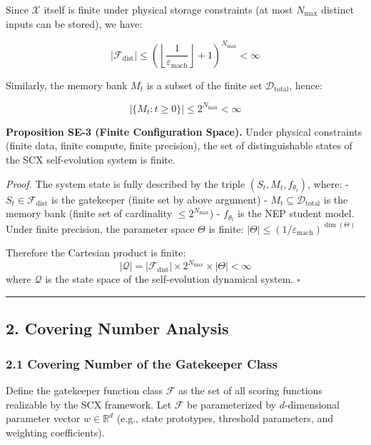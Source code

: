 \documentclass[
  12pt,
]{ctexart}
\begin{document}
Since \(\mathcal{X}\) itself is finite under physical storage
constraints (at most \(N_{\text{max}}\) distinct inputs can be stored),
we have:

\[|\mathcal{F}_{\text{dist}}| \leq \left( \left\lfloor \frac{1}{\varepsilon_{\text{mach}}} \right\rfloor + 1 \right)^{N_{\text{max}}} < \infty\]

Similarly, the memory bank \(M_t\) is a subset of the finite set
\(\mathcal{D}_{\text{total}}\), hence:

\[|\{M_t : t \geq 0\}| \leq 2^{N_{\text{max}}} < \infty\]

\textbf{Proposition SE-3 (Finite Configuration Space).} Under physical
constraints (finite data, finite compute, finite precision), the set of
distinguishable states of the SCX self-evolution system is finite.

\emph{Proof.} The system state is fully described by the triple
\((S_t, M_t, f_{\theta_t})\), where: -
\(S_t \in \mathcal{F}_{\text{dist}}\) is the gatekeeper (finite set by
above argument) - \(M_t \subseteq \mathcal{D}_{\text{total}}\) is the
memory bank (finite set of cardinality \(\leq 2^{N_{\text{max}}}\)) -
\(f_{\theta_t}\) is the NEP student model. Under finite precision, the
parameter space \(\Theta\) is finite:
\(|\Theta| \leq (1/\varepsilon_{\text{mach}})^{\dim(\Theta)}\)

Therefore the Cartesian product is finite:
\[|\mathcal{Q}| = |\mathcal{F}_{\text{dist}}| \times 2^{N_{\text{max}}} \times |\Theta| < \infty\]
where \(\mathcal{Q}\) is the state space of the self-evolution dynamical
system. \(\square\)

\begin{center}\rule{0.5\linewidth}{0.5pt}\end{center}

\subsection{2. Covering Number Analysis}\label{covering-number-analysis}

\subsubsection{2.1 Covering Number of the Gatekeeper
Class}\label{covering-number-of-the-gatekeeper-class}

Define the gatekeeper function class \(\mathcal{F}\) as the set of all
scoring functions realizable by the SCX framework. Let \(\mathcal{F}\)
be parameterized by \(d\)-dimensional parameter vector
\(w \in \mathbb{R}^d\) (e.g., state prototypes, threshold parameters,
and weighting coefficients).
\end{document}
